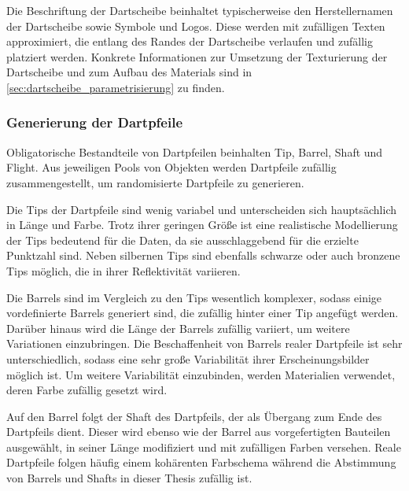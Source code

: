 Die Beschriftung der Dartscheibe beinhaltet typischerweise den Herstellernamen der Dartscheibe sowie Symbole und Logos. Diese werden mit zufälligen Texten approximiert, die entlang des Randes der Dartscheibe verlaufen und zufällig platziert werden. Konkrete Informationen zur Umsetzung der Texturierung der Dartscheibe und zum Aufbau des Materials sind in \autoref{sec:dartscheibe_parametrisierung} zu finden.

\subsubsection{Generierung der Dartpfeile}

Obligatorische Bestandteile von Dartpfeilen beinhalten Tip, Barrel, Shaft und Flight. Aus jeweiligen Pools von Objekten werden Dartpfeile zufällig zusammengestellt, um randomisierte Dartpfeile zu generieren.

Die Tips der Dartpfeile sind wenig variabel und unterscheiden sich hauptsächlich in Länge und Farbe. Trotz ihrer geringen Größe ist eine realistische Modellierung der Tips bedeutend für die Daten, da sie ausschlaggebend für die erzielte Punktzahl sind. Neben silbernen Tips sind ebenfalls schwarze oder auch bronzene Tips möglich, die in ihrer Reflektivität variieren.

Die Barrels sind im Vergleich zu den Tips wesentlich komplexer, sodass einige vordefinierte Barrels generiert sind, die zufällig hinter einer Tip angefügt werden. Darüber hinaus wird die Länge der Barrels zufällig variiert, um weitere Variationen einzubringen. Die Beschaffenheit von Barrels realer Dartpfeile ist sehr unterschiedlich, sodass eine sehr große Variabilität ihrer Erscheinungsbilder möglich ist. Um weitere Variabilität einzubinden, werden Materialien verwendet, deren Farbe zufällig gesetzt wird.

Auf den Barrel folgt der Shaft des Dartpfeils, der als Übergang zum Ende des Dartpfeils dient. Dieser wird ebenso wie der Barrel aus vorgefertigten Bauteilen ausgewählt, in seiner Länge modifiziert und mit zufälligen Farben versehen. Reale Dartpfeile folgen häufig einem kohärenten Farbschema während die Abstimmung von Barrels und Shafts in dieser Thesis zufällig ist.

